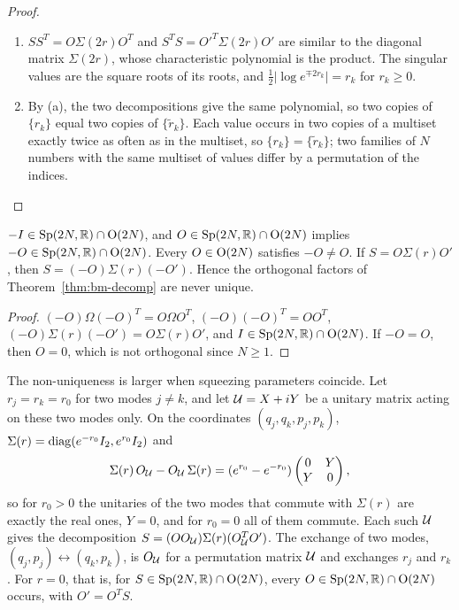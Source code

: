 \begin{vetdenv}
\begin{proof}
\begin{enumerate}
\item[(a)] $SS^T=O\Sigma(2r)O^T$ and $S^TS=O'^T\Sigma(2r)O'$ are similar to the diagonal matrix $\Sigma(2r)$, whose
characteristic polynomial is the product. The singular values are the square roots of its roots, and
$\frac12\lvert\log e^{\mp2r_k}\rvert=r_k$ for $r_k\ge0$.
\item[(b)] By (a), the two decompositions give the same polynomial, so two copies of $\{r_k\}$ equal two copies of
$\{\tilde r_k\}$. Each value occurs in two copies of a multiset exactly twice as often as in the multiset, so
$\{r_k\}=\{\tilde r_k\}$; two families of $N$ numbers with the same multiset of values differ by a permutation of the
indices.\qedhere
\end{enumerate}
\end{proof}

\begin{proposition}\label{prop:bm-nonunique}
$-I\in\mathrm{Sp}(2N,\mathbb R)\cap\mathrm{O}(2N)$, and $O\in\mathrm{Sp}(2N,\mathbb R)\cap\mathrm{O}(2N)$ implies $-O\in\mathrm{Sp}(2N,\mathbb R)\cap\mathrm{O}(2N)$. Every $O\in\mathrm{O}(2N)$ satisfies $-O\ne O$. If $S=O\Sigma(r)O'$, then
$S=(-O)\Sigma(r)(-O')$. Hence the orthogonal factors of Theorem~\ref{thm:bm-decomp} are never unique.
\end{proposition}

\begin{proof}
$(-O)\Omega(-O)^T=O\Omega O^T$, $(-O)(-O)^T=OO^T$, $(-O)\Sigma(r)(-O')=O\Sigma(r)O'$, and $I\in\mathrm{Sp}(2N,\mathbb R)\cap\mathrm{O}(2N)$. If $-O=O$, then
$O=0$, which is not orthogonal since $N\ge1$.
\end{proof}

The non-uniqueness is larger when squeezing parameters coincide. Let $r_j=r_k=r_0$ for two modes $j\ne k$, and let
$\mathcal U=X+iY$ be a unitary matrix acting on these two modes only. On the coordinates $(q_j,q_k,p_j,p_k)$,
$\Sigma(r)=\operatorname{diag}(e^{-r_0}I_2,e^{r_0}I_2)$ and
\[
 \Sigma(r)\,O_\mathcal U-O_\mathcal U\,\Sigma(r)=(e^{r_0}-e^{-r_0})\begin{pmatrix}0&Y\\Y&0\end{pmatrix},
\]
so for $r_0>0$ the unitaries of the two modes that commute with $\Sigma(r)$ are exactly the real ones, $Y=0$, and for
$r_0=0$ all of them commute. Each such $\mathcal U$ gives the decomposition $S=(OO_\mathcal U)\Sigma(r)(O_\mathcal U^TO')$. The exchange of two
modes, $(q_j,p_j)\leftrightarrow(q_k,p_k)$, is $O_\mathcal U$ for a permutation matrix $\mathcal U$ and exchanges $r_j$ and $r_k$. For
$r=0$, that is, for $S\in\mathrm{Sp}(2N,\mathbb R)\cap\mathrm{O}(2N)$, every $O\in\mathrm{Sp}(2N,\mathbb R)\cap\mathrm{O}(2N)$ occurs, with $O'=O^TS$.


\end{vetdenv}
